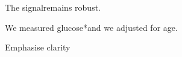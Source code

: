 \documentclass{article}
\begin{document}
\begin{listing-tex}    
  The signalremains robust.\par
  We measured glucose\Incidental[em-dash]*{and we adjusted for age}.\par
  Emphasise clarity
\end{listing-tex}
\end{document}
